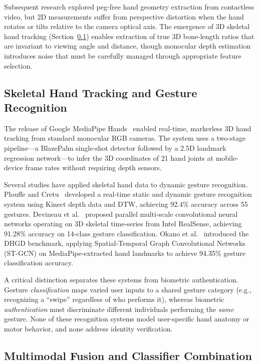 \documentclass[conference]{IEEEtran}
\begin{document}
Subsequent research explored peg-free hand geometry extraction from contactless video, but 2D measurements suffer from perspective distortion when the hand rotates or tilts relative to the camera optical axis. The emergence of 3D skeletal hand tracking (Section~\ref{sec:skeleton_tracking}) enables extraction of true 3D bone-length ratios that are invariant to viewing angle and distance, though monocular depth estimation introduces noise that must be carefully managed through appropriate feature selection.

\subsection{Skeletal Hand Tracking and Gesture Recognition}
\label{sec:skeleton_tracking}

The release of Google MediaPipe Hands~\cite{mediapipe} enabled real-time, markerless 3D hand tracking from standard monocular RGB cameras. The system uses a two-stage pipeline---a BlazePalm single-shot detector followed by a 2.5D landmark regression network---to infer the 3D coordinates of 21 hand joints at mobile-device frame rates without requiring depth sensors.

Several studies have applied skeletal hand data to dynamic gesture recognition. Plouffe and Cretu~\cite{plouffe2016} developed a real-time static and dynamic gesture recognition system using Kinect depth data and DTW, achieving 92.4\% accuracy across 55 gestures. Devineau et al.~\cite{devineau2018} proposed parallel multi-scale convolutional neural networks operating on 3D skeletal time-series from Intel RealSense, achieving 91.28\% accuracy on 14-class gesture classification. Okano et al.~\cite{dhgd2024} introduced the DHGD benchmark, applying Spatial-Temporal Graph Convolutional Networks (ST-GCN) on MediaPipe-extracted hand landmarks to achieve 94.35\% gesture classification accuracy.

A critical distinction separates these systems from biometric authentication. Gesture \textit{classification} maps varied user inputs to a shared gesture category (e.g., recognizing a ``swipe'' regardless of who performs it), whereas biometric \textit{authentication} must discriminate different individuals performing the \textit{same} gesture. None of these recognition systems model user-specific hand anatomy or motor behavior, and none address identity verification.

\subsection{Multimodal Fusion and Classifier Combination}
\end{document}

